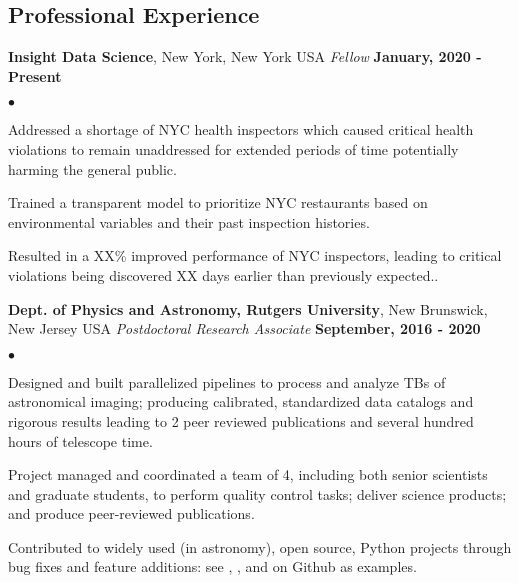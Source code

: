 \documentclass[margin,line, 11pt]{res}
\newenvironment{list2}{
  \begin{list}{$\bullet$}{%
      \setlength{\itemsep}{0in}
      \setlength{\parsep}{0in} \setlength{\parskip}{0in}
      \setlength{\topsep}{0in} \setlength{\partopsep}{0in}
      \setlength{\leftmargin}{0.2in}}}{\end{list}}
\begin{document}
\begin{resume}
\section{Professional \newline Experience}
\textbf{Insight Data Science}, New York, New York USA \newline
\textit{Fellow} \hfill \textbf{January, 2020 - Present}\newline
    \begin{list2}
    	\vspace*{-5mm}
    	\item Addressed a shortage of NYC health inspectors which caused critical health violations to remain unaddressed for extended periods of time potentially harming the general public.
    	\item Trained a transparent model to prioritize NYC restaurants based on environmental variables and their past inspection histories.
    	\item Resulted in a XX\% improved performance of NYC inspectors, leading to critical violations being discovered XX days earlier than previously expected..
    \end{list2}
\vspace*{-3mm}

\textbf{Dept. of Physics and Astronomy, Rutgers University}, New Brunswick, New Jersey USA \newline
\textit{Postdoctoral Research Associate} \hfill \textbf{September, 2016 - 2020}\newline
    \begin{list2}
    	\vspace*{-5mm}
    	\item Designed and built parallelized pipelines to process and analyze TBs of astronomical imaging; producing calibrated, standardized data catalogs and rigorous results leading to 2 peer reviewed publications and several hundred hours of telescope time.
    	\item Project managed and coordinated a team of 4, including both senior scientists and graduate students,
      to perform quality control tasks; deliver science products; and produce peer-reviewed publications.
    	\item Contributed to widely used (in astronomy), open source, Python projects through bug fixes and feature additions: see \href{https://github.com/boada/photometrypipeline}{}, \href{http://astlib.sourceforge.net/}{}, and \href{https://github.com/boada/easyGalaxy}{} on Github as examples.
    \end{list2}
\vspace*{-3mm}


\end{resume}
\end{document}
